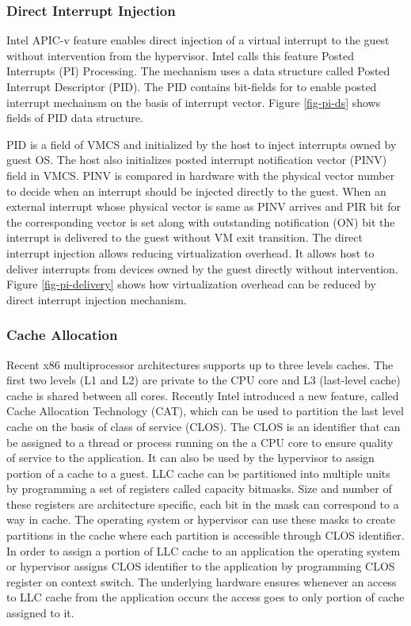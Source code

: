 

\subsubsection{Direct Interrupt Injection} \label{sec:dii}
Intel APIC-v feature enables direct injection of a virtual interrupt to the guest without intervention from the hypervisor.
Intel calls this feature Posted Interrupts (PI) Processing. The mechanism uses a data structure called Posted Interrupt Descriptor (PID).
The PID contains bit-fields for to enable posted interrupt mechainsm on the basis of interrupt vector.
Figure \ref{fig-pi-ds} shows fields of PID data structure.

PID is a field of VMCS and initialized by the host to inject interrupts owned by guest OS. 
The host also initializes posted interrupt notification vector (PINV) field in VMCS.
PINV is compared in hardware with the physical vector number to decide when an interrupt should be injected directly to the guest.
When an external interrupt whose physical vector is same as PINV arrives and PIR bit for the corresponding vector is set along with outstanding notification (ON) bit the interrupt is delivered to the guest without VM exit transition.
The direct interrupt injection allows reducing virtualization overhead. It allows host to deliver interrupts from devices owned by the guest directly without
intervention. Figure \ref{fig-pi-delivery} shows how virtualization overhead can be reduced by direct interrupt injection mechanism.



\subsubsection{Cache Allocation} \label{sec:cat}
Recent x86 multiprocessor architectures supports up to three levels caches. The first two levels (L1 and L2) are private to the CPU core and L3 (last-level cache) cache is shared between all cores. 
Recently Intel introduced a new feature, called Cache Allocation Technology (CAT), which can be used to partition the last
level cache on the basis of class of service (CLOS). The CLOS is an identifier that can be assigned to a thread or process running on the a CPU core
to ensure quality of service to the application. It can also be used by the hypervisor to assign portion of a cache to a guest.
LLC cache can be partitioned into multiple units by programming a set of registers called capacity bitmasks. Size and number of these registers are
architecture specific, each bit in the mask can correspond to a way in cache. The operating system or hypervisor can use these masks to create 
partitions in the cache where each partition is accessible through CLOS identifier. In order to assign a portion of LLC cache to an application
the operating system or hypervisor assigns CLOS identifier to the application by programming CLOS register on context switch. The underlying hardware ensures 
whenever an access to LLC cache from the application occurs the access goes to only portion of cache assigned to it.

